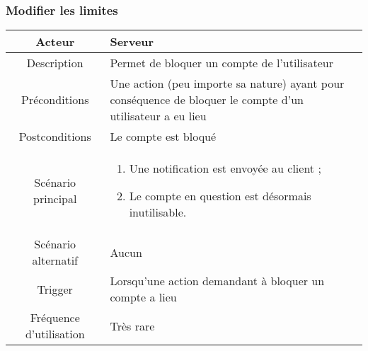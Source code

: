 \documentclass{article}
\begin{document}
\subsubsection{Modifier les limites}
\begin{table}[h!]

\begin{tabular}{|c|p{11cm}|}
\hline
Acteur & Serveur \\
\hline
Description & Permet de bloquer un compte de l'utilisateur \\
\hline
Préconditions & Une action (peu importe sa nature) ayant pour conséquence de bloquer le compte d'un utilisateur a eu lieu \\
\hline
Postconditions & Le compte est bloqué \\
\hline
Scénario principal & \begin{enumerate}
\item Une notification est envoyée au client ;
\item Le compte en question est désormais inutilisable.
\end{enumerate} \\
\hline
Scénario alternatif & Aucun \\
\hline
Trigger & Lorsqu'une action demandant à bloquer un compte a lieu \\
\hline
Fréquence d'utilisation & Très rare \\
\hline
\end{tabular}

\end{table}
\end{document}
